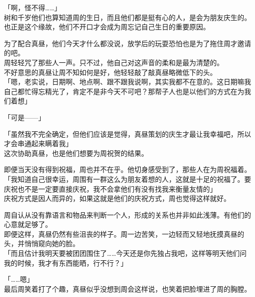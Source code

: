 「啊，怪不得……」\\

树和千岁他们也算知道周的生日，而且他们都是挺有心的人，是会为朋友庆生的。也正是这个缘故，他们不开口才会成为周忘记自己生日的重要原因。

为了配合真昼，他们今天才什么都没说，放学后的玩耍恐怕也是为了拖住周才邀请的吧。\\

周轻轻咒了那些人一声。只不过，他自己对这声音的柔和是最为清楚的。\\

不好意思的真昼让周不知如何是好，他轻轻敲了敲真昼略微低下的头。\\

「嗯，老实说，日期啊、地点啊、跟不跟我说啊，其实我都不在意的。这日期嘛我自己都忙得忘精光了，肯定不是非今天不可吧？那帮子人也是以他们的方式在为我们着想」

「可是——」

「虽然我不完全确定，但他们应该是觉得，真昼策划的庆生才最让我幸福吧，所以才会串通起来瞒着我」\\

这次协助真昼，也是他们想要为周祝贺的结果。

即便当天没有得到祝福，周也并不在乎。他切身感受到了，那些人在为周祝福着。\\

「我知道自己很幸运，周围有一群这么为朋友着想的人，这就是十足的祝福了。要庆祝也不是一定要直接庆祝，我不会拿他们有没有找我来衡量友情的」\\

庆祝方式是因人而异的，如果这就是他们的庆祝方式，周也觉得这样就好。

周自认从没有靠语言和物品来判断一个人，形成的关系也并非如此浅薄。有他们的心意就足够了。\\

即便这样，真昼仍然有些沮丧的样子。周一边苦笑，一边轻而又轻地抚摸真昼的头，并悄悄窥向她的脸。\\

「而且估计我明天要被团团围住了……今天还是你先独占我吧，这样等明天他们问我的时候，我才有东西能晒，行不行？」

「……嗯」\\

最后周笑着打了个趣，真昼似乎没想到周会这样说，也笑着把脸埋进了周的胸膛。

